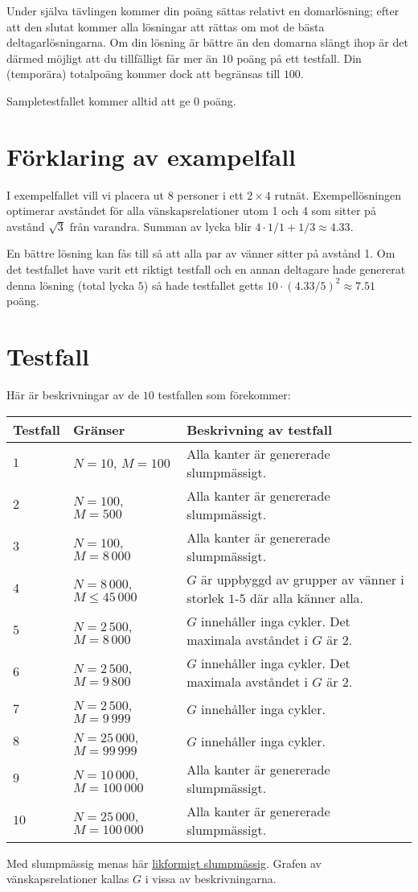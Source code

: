 Under själva tävlingen kommer din poäng sättas relativt en domarlösning;
efter att den slutat kommer alla lösningar att rättas om mot de bästa deltagarlösningarna.
Om din lösning är bättre än den domarna slängt ihop är det därmed möjligt att du tillfälligt får mer än $10$ poäng på ett testfall.
Din (temporära) totalpoäng kommer dock att begränsas till $100$.

Sampletestfallet kommer alltid att ge $0$ poäng.


\section*{Förklaring av exampelfall}
I exempelfallet vill vi placera ut 8 personer i ett $2 \times 4$ rutnät.
Exempellösningen optimerar avståndet för alla vänskapsrelationer utom 1 och 4 som sitter på avstånd $\sqrt 3$ från varandra.
Summan av lycka blir $4 \cdot 1/1 + 1/3 \approx 4.33$.

En bättre lösning kan fås till så att alla par av vänner sitter på avstånd 1.
Om det testfallet have varit ett riktigt testfall och en annan deltagare hade genererat denna lösning
(total lycka $5$) så hade testfallet getts $10 \cdot (4.33 / 5)^2 \approx 7.51$ poäng.

\section*{Testfall}
Här är beskrivningar av de $10$ testfallen som förekommer:

\noindent
\begin{tabular}{| l | l | l |}
\hline
Testfall & Gränser                       & Beskrivning av testfall \\ \hline
$1$       & $N = 10$, $M = 100$           & Alla kanter är genererade slumpmässigt. \\ \hline
$2$       & $N = 100$, $M = 500$          & Alla kanter är genererade slumpmässigt. \\ \hline
$3$       & $N = 100$, $M = 8\,000$       & Alla kanter är genererade slumpmässigt. \\ \hline
$4$       & $N = 8\,000$, $M \le 45\,000$ & $G$ är uppbyggd av grupper av vänner i storlek $1$-$5$ där alla känner alla. \\ \hline
$5$       & $N = 2\,500$, $M = 8\,000$    & $G$ innehåller inga cykler. Det maximala avståndet i $G$ är $2$. \\ \hline
$6$       & $N = 2\,500$, $M = 9\,800$    & $G$ innehåller inga cykler. Det maximala avståndet i $G$ är $2$. \\ \hline
$7$       & $N = 2\,500$, $M = 9\,999$    & $G$ innehåller inga cykler. \\ \hline
$8$       & $N = 25\,000$, $M = 99\,999$  & $G$ innehåller inga cykler. \\ \hline
$9$       & $N = 10\,000$, $M = 100\,000$ & Alla kanter är genererade slumpmässigt. \\ \hline
$10$      & $N = 25\,000$, $M = 100\,000$ & Alla kanter är genererade slumpmässigt. \\ \hline
\end{tabular}

Med slumpmässig menas här \href{https://sv.wikipedia.org/wiki/Likformig_sannolikhetsf\%C3\%B6rdelning}{likformigt slumpmässig}. 
Grafen av vänskapsrelationer kallas $G$ i vissa av beskrivningarna.

